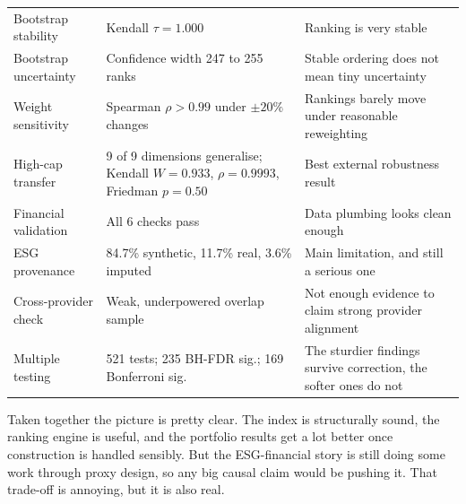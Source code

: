 \begin{table}[!htbp]
\begin{tabular}{p{3.6cm} p{4.0cm} p{5.6cm}}
Bootstrap stability & Kendall $\tau = 1.000$ & Ranking is very stable \\
Bootstrap uncertainty & Confidence width 247 to 255 ranks & Stable ordering does not mean tiny uncertainty \\
Weight sensitivity & Spearman $\rho > 0.99$ under \(\pm 20\%\) changes & Rankings barely move under reasonable reweighting \\
High-cap transfer & 9 of 9 dimensions generalise; Kendall $W = 0.933$, $\rho = 0.9993$, Friedman $p = 0.50$ & Best external robustness result \\
Financial validation & All 6 checks pass & Data plumbing looks clean enough \\
ESG provenance & 84.7\% synthetic, 11.7\% real, 3.6\% imputed & Main limitation, and still a serious one \\
Cross-provider check & Weak, underpowered overlap sample & Not enough evidence to claim strong provider alignment \\
Multiple testing & 521 tests; 235 BH-FDR sig.; 169 Bonferroni sig. & The sturdier findings survive correction, the softer ones do not \\
\bottomrule
\end{tabular}
\end{table}

Taken together the picture is pretty clear.
The index is structurally sound, the ranking engine is useful, and the portfolio results get a lot better once construction is handled sensibly.
But the ESG-financial story is still doing some work through proxy design, so any big causal claim would be pushing it.
That trade-off is annoying, but it is also real.
